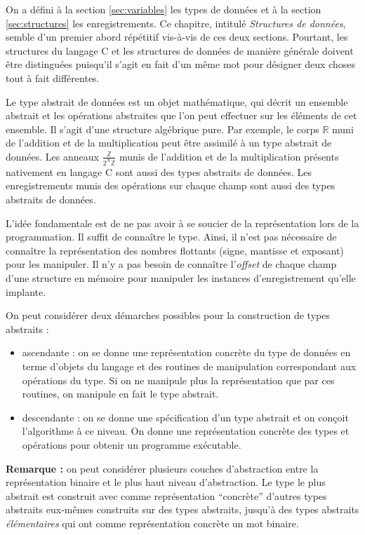 \documentclass[../../../main.tex]{subfiles}
\begin{document}
On a défini à la section \ref{sec:variables} les types de données et à la section \ref{sec:structures} les enregistrements. Ce chapitre, intitulé \textit{Structures de données}, semble d'un premier abord répétitif vis-à-vis de ces deux sections. Pourtant, les structures du langage C et les structures de données de manière générale doivent être distinguées puisqu'il s'agit en fait d'un même mot pour désigner deux choses tout à fait différentes.

Le type abstrait de données est un objet mathématique, qui décrit un ensemble abstrait et les opérations abstraites que l'on peut effectuer sur les éléments de cet ensemble. Il s'agit d'une structure algébrique pure. Par exemple, le corps $\mathbb{R}$ muni de l'addition et de la multiplication peut être assimilé à un type abstrait de données. Les anneaux $\frac{\mathbb{Z}}{2^N\mathbb{Z}}$ munis de l'addition et de la multiplication présents nativement en langage C sont aussi des types abstraits de données. Les enregistrements munis des opérations sur chaque champ sont aussi des types abstraits de données.

L'idée fondamentale est de ne pas avoir à se soucier de la représentation lors de la programmation. Il suffit de connaître le type. Ainsi, il n'est pas nécessaire de connaître la représentation des nombres flottants (signe, mantisse et exposant) pour les manipuler. Il n'y a pas besoin de connaître l'\textit{offset} de chaque champ d'une structure en mémoire pour manipuler les instances d'enregistrement qu'elle implante.

On peut considérer deux démarches possibles pour la construction de types abstraits :
\begin{itemize}
	\item ascendante : on se donne une représentation concrète du type de données en terme d'objets du langage et des routines de manipulation correspondant aux opérations du type. Si on ne manipule plus la représentation que par ces routines, on manipule en fait le type abstrait.
	\item descendante : on se donne une spécification d'un type abstrait et on conçoit l'algorithme à ce niveau. On donne une représentation concrète des types et opérations pour obtenir un programme exécutable.
\end{itemize}
\textbf{Remarque :} on peut considérer plusieurs couches d'abstraction entre la représentation binaire et le plus haut niveau d'abstraction. Le type le plus abstrait est construit avec comme représentation ``concrète'' d'autres types abstraits eux-mêmes construits sur des types abstraits, jusqu'à des types abstraits \textit{élémentaires} qui ont comme représentation concrète un mot binaire.
\end{document}
